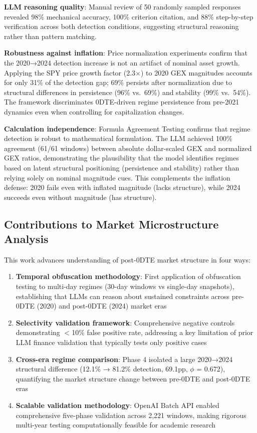 \textbf{LLM reasoning quality}: Manual review of 50 randomly sampled responses revealed 98\% mechanical accuracy, 100\% criterion citation, and 88\% step-by-step verification across both detection conditions, suggesting structural reasoning rather than pattern matching.

\textbf{Robustness against inflation}: Price normalization experiments confirm that the 2020→2024 detection increase is not an artifact of nominal asset growth. Applying the SPY price growth factor (2.3$\times$) to 2020 GEX magnitudes accounts for only 31\% of the detection gap; 69\% persists after normalization due to structural differences in persistence (96\% vs.\ 69\%) and stability (99\% vs.\ 54\%). The framework discriminates 0DTE-driven regime persistence from pre-2021 dynamics even when controlling for capitalization changes.

\textbf{Calculation independence}: Formula Agreement Testing confirms that regime detection is robust to mathematical formulation. The LLM achieved 100\% agreement (61/61 windows) between absolute dollar-scaled GEX and normalized GEX ratios, demonstrating the plausibility that the model identifies regimes based on latent structural positioning (persistence and stability) rather than relying solely on nominal magnitude cues. This complements the inflation defense: 2020 fails even with inflated magnitude (lacks structure), while 2024 succeeds even without magnitude (has structure).

\subsection{Contributions to Market Microstructure Analysis}

This work advances understanding of post-0DTE market structure in four ways:

\begin{enumerate}
\item \textbf{Temporal obfuscation methodology}: First application of obfuscation testing to multi-day regimes (30-day windows vs single-day snapshots), establishing that LLMs can reason about sustained constraints across pre-0DTE (2020) and post-0DTE (2024) market eras
\item \textbf{Selectivity validation framework}: Comprehensive negative controls demonstrating $<$10\% false positive rate, addressing a key limitation of prior LLM finance validation that typically tests only positive cases
\item \textbf{Cross-era regime comparison}: Phase 4 isolated a large 2020→2024 structural difference (12.1\% → 81.2\% detection, 69.1pp, $\phi$ = 0.672), quantifying the market structure change between pre-0DTE and post-0DTE eras
\item \textbf{Scalable validation methodology}: OpenAI Batch API enabled comprehensive five-phase validation across 2,221 windows, making rigorous multi-year testing computationally feasible for academic research
\end{enumerate}

